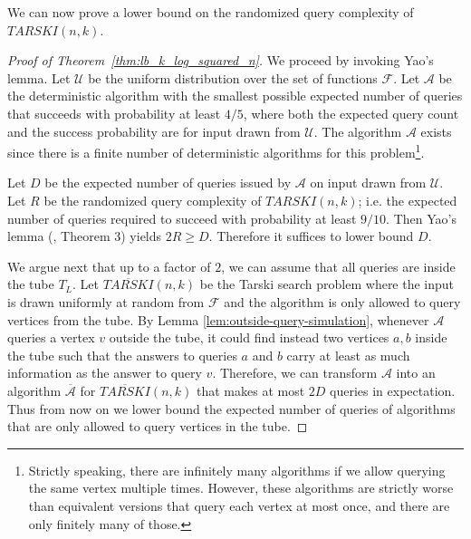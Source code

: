\documentclass[11pt]{article}
\begin{document}
We can now prove a lower bound on the randomized query complexity of $TARSKI(n,k)$.

\begin{proof}[Proof of Theorem~\ref{thm:lb_k_log_squared_n}]
We proceed by invoking Yao's lemma.
    Let  $\mathcal{U}$ be the uniform distribution over the set of functions $\mathcal{F}$. %
  Let $\mathcal{A}$ be the deterministic algorithm with the smallest possible expected number of queries that succeeds with probability at least $4/5$, where both the expected query count and the success probability are for input drawn from $\mathcal{U}$.
    The algorithm $\mathcal{A}$ exists since there is a finite number of deterministic algorithms for this problem\footnote{Strictly speaking, there are infinitely many algorithms if we allow querying the same vertex multiple times. However, these algorithms are strictly worse than equivalent versions that query each vertex at most once, and there are only finitely many of those.}.
    
    Let $D$ be the expected number of queries issued by $\mathcal{A}$ on input drawn from $\mathcal{U}$.
    Let $R$ be the randomized query complexity of $TARSKI(n,k)$; i.e. the expected number of queries required to succeed with probability at least $9/10$.
    Then Yao's lemma (\cite{yao1977minimaxprinciple}, Theorem 3) yields $2R \ge D$. 
    Therefore it  suffices to lower bound $D$. 

    We argue next that up to a factor of $2$, we can assume that all queries are inside the tube $T_L$. Let  $\overline{TARSKI}(n,k)$ be the Tarski search problem where the input is drawn uniformly at random from $\mathcal{F}$ and    
    the algorithm is only allowed to  query vertices from the tube.
By Lemma \ref{lem:outside-query-simulation}, whenever $\mathcal{A}$ queries a vertex $v$ outside the tube, it could find instead two vertices $a,b$ inside the tube such that the answers to queries $a$ and $b$ carry at least as much information as the answer to query $v$.
Therefore, we can transform $\mathcal{A}$ into an algorithm $\overline{\mathcal{A}}$ for $\overline{TARSKI}(n, k)$ that makes at most $2D$ queries in expectation. Thus from now on we lower bound the expected number of queries of algorithms that are only allowed to query vertices in the tube.




\end{proof}
\end{document}

